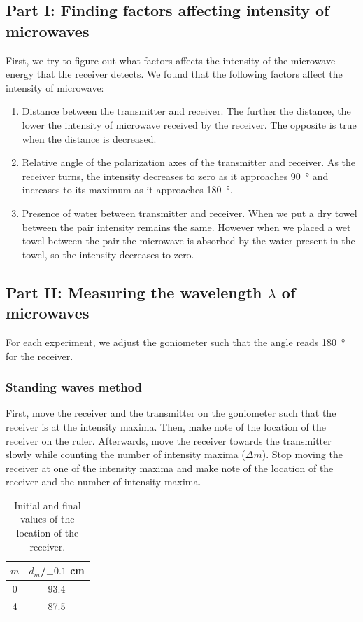 \documentclass[letter,12pt]{article}
\newcommand{\tlambda}{\(\lambda\) }
\numberwithin{equation}{section}
\numberwithin{figure}{section}
\numberwithin{table}{section}
\begin{document}
\subsection{Part I: Finding factors affecting intensity of microwaves}
First, we try to figure out what factors affects the intensity of the microwave energy that the receiver detects. We found that the following factors affect the intensity of microwave:

\begin{enumerate}
  \item Distance between the transmitter and receiver. The further the distance, the lower the intensity of microwave received by the receiver. The opposite is true when the distance is decreased.
  \item Relative angle of the polarization axes of the transmitter and receiver. As the receiver turns, the intensity decreases to zero as it approaches \SI{90}{\degree} and increases to its maximum as it approaches \SI{180}{\degree}.
  \item Presence of water between transmitter and receiver. When we put a dry towel between the pair intensity remains the same. However when we placed a wet towel between the pair the microwave is absorbed by the water present in the towel, so the intensity decreases to zero.
\end{enumerate}

\subsection{Part II: Measuring the wavelength \tlambda of microwaves}
For each experiment, we adjust the goniometer such that the angle reads \SI{180}{\degree} for the receiver.

\subsubsection{Standing waves method}
First, move the receiver and the transmitter on the goniometer such that the receiver is at the intensity maxima. Then, make note of the location of the receiver on the ruler. Afterwards, move the receiver towards the transmitter slowly while counting the number of intensity maxima (\(\Delta m\)). Stop moving the receiver at one of the intensity maxima and make note of the location of the receiver and the number of intensity maxima.

\begin{table}[!ht]
  \centering
  \begin{tabular}{cS}
    \toprule
    {\(m\)} & {\(d_m\)/\(\pm 0.1\) \si{\cm}} \\  & 93.4 \\
    4 & 87.5 \\
    \bottomrule
  \end{tabular}
  \caption{Initial and final values of the location of the receiver.}
  \label{table:e1}
\end{table}
\end{document}
